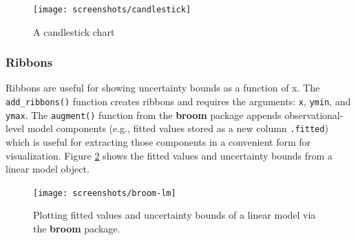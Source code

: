\documentclass[12pt,]{isuthesis}
\newenvironment{Shaded}{\begin{snugshade}}{\end{snugshade}}
\newcommand{\KeywordTok}[1]{\textcolor[rgb]{0.13,0.29,0.53}{\textbf{{#1}}}}
\newcommand{\DataTypeTok}[1]{\textcolor[rgb]{0.13,0.29,0.53}{{#1}}}
\newcommand{\FloatTok}[1]{\textcolor[rgb]{0.00,0.00,0.81}{{#1}}}
\newcommand{\StringTok}[1]{\textcolor[rgb]{0.31,0.60,0.02}{{#1}}}
\newcommand{\OtherTok}[1]{\textcolor[rgb]{0.56,0.35,0.01}{{#1}}}
\newcommand{\NormalTok}[1]{{#1}}
\begin{document}
\begin{figure}
\centering
\texttt{[image: screenshots/candlestick]}
\caption{\label{fig:candlestick}A candlestick chart}
\end{figure}

\subsubsection{Ribbons}\label{ribbons}

Ribbons are useful for showing uncertainty bounds as a function of x.
The \texttt{add\_ribbons()} function creates ribbons and requires the
arguments: \texttt{x}, \texttt{ymin}, and \texttt{ymax}. The
\texttt{augment()} function from the \textbf{broom} package appends
observational-level model components (e.g., fitted values stored as a
new column \texttt{.fitted}) which is useful for extracting those
components in a convenient form for visualization. Figure
\ref{fig:broom-lm} shows the fitted values and uncertainty bounds from a
linear model object.

\begin{Shaded}
\end{Shaded}

\begin{figure}
\centering
\texttt{[image: screenshots/broom-lm]}
\caption{\label{fig:broom-lm}Plotting fitted values and uncertainty bounds
of a linear model via the \textbf{broom} package.}
\end{figure}
\end{document}
